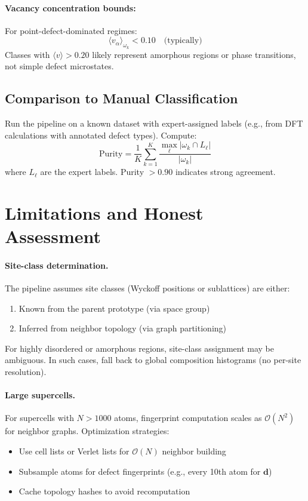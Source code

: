 \documentclass[11pt]{article}
\begin{document}
\paragraph{Vacancy concentration bounds:}
For point-defect-dominated regimes:
\begin{equation}
\langle v_\alpha \rangle_{\omega_k} < 0.10
\quad \text{(typically)}
\end{equation}
Classes with $\langle v \rangle > 0.20$ likely represent amorphous regions or
phase transitions, not simple defect microstates.

\subsection{Comparison to Manual Classification}

Run the pipeline on a known dataset with expert-assigned labels (e.g., from DFT
calculations with annotated defect types). Compute:
\begin{equation}
\mathrm{Purity} = \frac{1}{K} \sum_{k=1}^K \frac{\max_{\ell} |\omega_k \cap L_\ell|}{|\omega_k|}
\end{equation}
where $L_\ell$ are the expert labels. Purity $> 0.90$ indicates strong agreement.

\section{Limitations and Honest Assessment}

\paragraph{Site-class determination.}
The pipeline assumes site classes (Wyckoff positions or sublattices) are either:
\begin{enumerate}
  \item Known from the parent prototype (via space group)
  \item Inferred from neighbor topology (via graph partitioning)
\end{enumerate}
For highly disordered or amorphous regions, site-class assignment may be ambiguous.
In such cases, fall back to global composition histograms (no per-site resolution).

\paragraph{Large supercells.}
For supercells with $N > 1000$ atoms, fingerprint computation scales as
$\mathcal{O}(N^2)$ for neighbor graphs. Optimization strategies:
\begin{itemize}
  \item Use cell lists or Verlet lists for $\mathcal{O}(N)$ neighbor building
  \item Subsample atoms for defect fingerprints (e.g., every 10th atom for $\mathbf{d}$)
  \item Cache topology hashes to avoid recomputation
\end{itemize}
\end{document}
